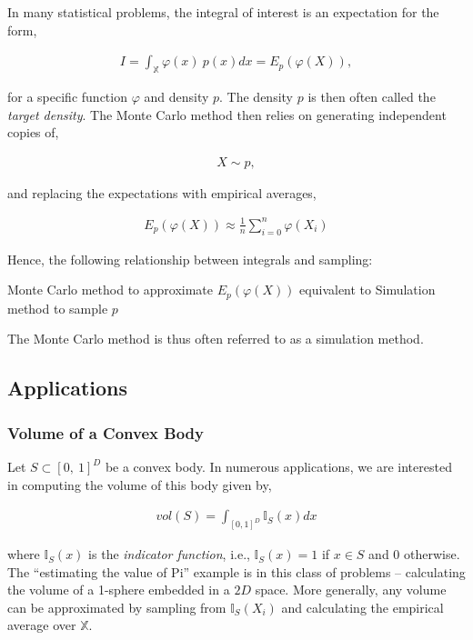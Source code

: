 In many statistical problems, the integral of interest is an expectation
for the form,

\begin{align}I = \int_{\mathbb{X}}^{}{\varphi(x)\ p(x)}dx = E_{p}\left( \varphi(X) \right),\end{align}

for a specific function \(\varphi\) and density \(p\). The density \(p\)
is then often called the \emph{target density}. The Monte Carlo method
then relies on generating independent copies of,

\begin{align}X \sim p,\end{align}

and replacing the expectations with empirical averages,

\begin{align}E_{p}\left( \varphi(X) \right) \approx \frac{1}{n}\sum_{i = 0}^{n}{\varphi(X_{i})}\end{align}

Hence, the following relationship between integrals and sampling:

Monte Carlo method to approximate \(E_{p}\left( \varphi(X) \right)\) equivalent to
Simulation method to sample \(p\)

The Monte Carlo method is thus often referred to as a simulation method.

\subsection{Applications}\label{applications}

\subsubsection{Volume of a Convex Body}\label{volume-of-a-convex-body}

Let \(S \subset [ 0,\ 1]^{D}\) be a convex body. In numerous
applications, we are interested in computing the volume of this body
given by,

\begin{align}vol(S) = \int_{[ 0,1]^{D}}^{}{\mathbb{I}_{S}(x)}dx\end{align}

where \(\mathbb{I}_{S}(x)\) is the \emph{indicator function}, i.e.,
\(\mathbb{I}_{S}(x) = 1\) if \(x \in S\) and \(0\) otherwise. The
``estimating the value of Pi'' example is in this class of problems --
calculating the volume of a 1-sphere embedded in a \(2D\) space. More
generally, any volume can be approximated by sampling from
\(\mathbb{I}_{S}(X_{i})\) and calculating the empirical average over
\(\mathbb{X}\).

